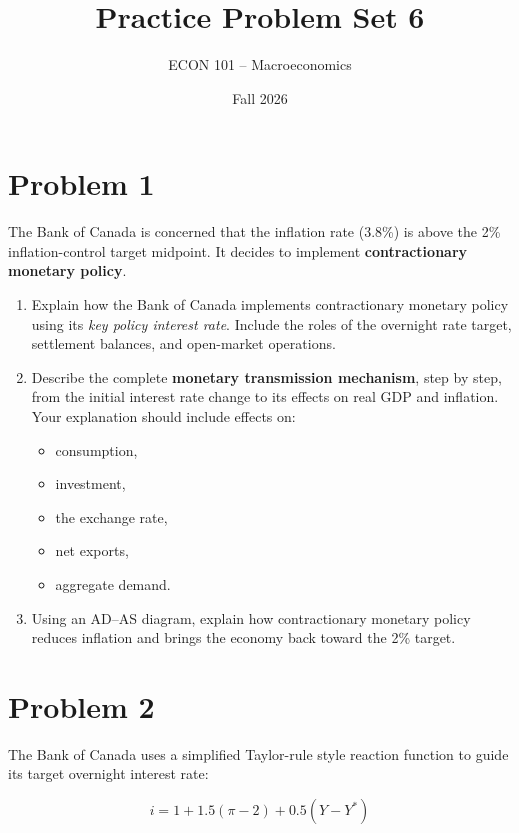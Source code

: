 \documentclass[12pt]{article}
\title{Practice Problem Set 6}
\author{ECON 101 -- Macroeconomics}
\date{Fall 2026}
\begin{document}
\maketitle

\section*{Problem 1}

The Bank of Canada is concerned that the inflation rate (3.8\%) is above the 2\% inflation-control target midpoint. 
It decides to implement \textbf{contractionary monetary policy}.



\begin{enumerate}
    \item[(a)] Explain how the Bank of Canada implements contractionary monetary policy using its \emph{key policy interest rate}. 
    Include the roles of the overnight rate target, settlement balances, and open-market operations.
    
    \item[(b)] Describe the complete \textbf{monetary transmission mechanism}, step by step, from the initial interest rate change to its effects on real GDP and inflation. 
    Your explanation should include effects on:
    \begin{itemize}
        \item consumption,
        \item investment,
        \item the exchange rate,
        \item net exports,
        \item aggregate demand.
    \end{itemize}
    
    \item[(c)] Using an AD--AS diagram, explain how contractionary monetary policy reduces inflation and brings the economy back toward the 2\% target.
\end{enumerate}

\newpage

\section*{Problem 2}

The Bank of Canada uses a simplified Taylor-rule style reaction function to guide its target overnight interest rate:

\[
i = 1 + 1.5(\pi - 2) + 0.5(Y - Y^*)
\]
\end{document}
